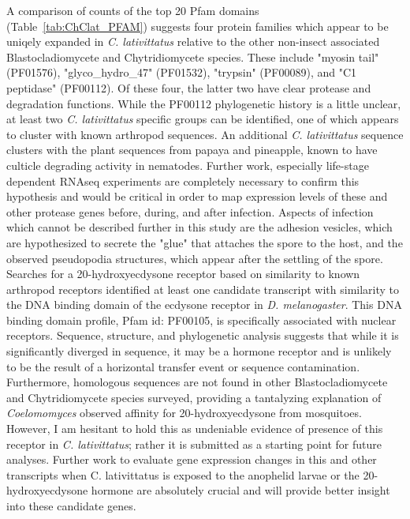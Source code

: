 \indent A comparison of counts of the top 20 Pfam domains (Table~\ref{tab:ChClat_PFAM}) suggests four protein families which appear to be uniqely expanded in \textit{C. lativittatus} relative to the other non-insect associated Blastocladiomycete and Chytridiomycete species. These include "myosin tail" (PF01576), "glyco\_hydro\_47" (PF01532), "trypsin" (PF00089), and "C1 peptidase" (PF00112). Of these four, the latter two have clear protease and degradation functions. While the PF00112 phylogenetic history is a little unclear, at least two \textit{C. lativittatus} specific groups can be identified, one of which appears to cluster with known arthropod sequences. An additional \textit{C. lativittatus} sequence clusters with the plant sequences from papaya and pineapple, known to have culticle degrading activity in nematodes. Further work, especially life-stage dependent RNAseq experiments are completely necessary to confirm this hypothesis and would be critical in order to map expression levels of these and other protease genes before, during, and after infection. Aspects of infection which cannot be described further in this study are the adhesion vesicles, which are hypothesized to secrete the "glue" that attaches the spore to the host, and the observed pseudopodia structures, which appear after the settling of the spore. \\
\indent Searches for a 20-hydroxyecdysone receptor based on similarity to known arthropod receptors identified at least one candidate transcript with similarity to the DNA binding domain of the ecdysone receptor in \textit{D. melanogaster}. This DNA binding domain profile, Pfam id: PF00105, is specifically associated with nuclear receptors. Sequence, structure, and phylogenetic analysis suggests that while it is significantly diverged in sequence, it may be a hormone receptor and is unlikely to be the result of a horizontal transfer event or sequence contamination. Furthermore, homologous sequences are not found in other Blastocladiomycete and Chytridiomycete species surveyed, providing a tantalyzing explanation of \textit{Coelomomyces} observed affinity for 20-hydroxyecdysone from mosquitoes. However, I am hesitant to hold this as undeniable evidence of presence of this receptor in \textit{C. lativittatus}; rather it is submitted as a starting point for future analyses. Further work to evaluate gene expression changes in this and other transcripts when C. lativittatus is exposed to the anophelid larvae or the 20-hydroxyecdysone hormone are absolutely crucial and will provide better insight into these candidate genes. \\
